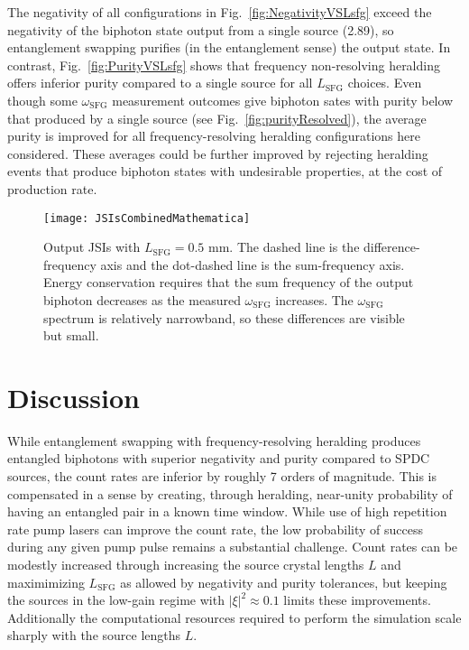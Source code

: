 \documentclass[twocolumn,amssymb, nobibnotes, showpacs, aps, pra,10pt]{revtex4-1}
\newcommand*{\wsfg}{\omega_\textrm{SFG}}
\begin{document}
The negativity of all configurations in Fig.\ \ref{fig:NegativityVSLsfg} exceed the negativity of the biphoton state output from a single source (2.89), so entanglement swapping purifies (in the entanglement sense) the output state. In contrast, Fig.\ \ref{fig:PurityVSLsfg} shows that frequency non-resolving heralding offers inferior purity compared to a single source for all $L_{\text{SFG}}$ choices. Even though some $\wsfg$ measurement outcomes give biphoton sates with purity below that produced by a single source (see Fig.\ \ref{fig:purityResolved}), the average purity is improved for all frequency-resolving heralding configurations here considered. These averages could be further improved by rejecting heralding events that produce biphoton states with undesirable properties, at the cost of production rate.

\begin{figure*}[p]
\begin{center}
\texttt{[image: JSIsCombinedMathematica]}
\caption{Output JSIs with $L_{\text{SFG}} = 0.5$ mm. The dashed line is the difference-frequency axis and the dot-dashed line is the sum-frequency axis. Energy conservation requires that the sum frequency of the output biphoton decreases as the measured $\wsfg$ increases. The $\wsfg$ spectrum is relatively narrowband, so these differences are visible but small.}
\label{fig:outputJSIs}
\end{center}
\end{figure*}

\section{Discussion}
While entanglement swapping with frequency-resolving heralding produces entangled biphotons with superior negativity and purity compared to SPDC sources, the count rates are inferior by roughly 7 orders of magnitude. This is compensated in a sense by creating, through heralding, near-unity probability of having an entangled pair in a known time window. While use of high repetition rate pump lasers can improve the count rate, the low probability of success during any given pump pulse remains a substantial challenge. Count rates can be modestly increased through increasing the source crystal lengths $L$ and maximimizing $L_{\text{SFG}}$ as allowed by negativity and purity tolerances, but keeping the sources in the low-gain regime with $|\xi|^2 \approx 0.1$ limits these improvements. Additionally the computational resources required to perform the simulation scale sharply with the source lengths $L$.
 
\end{document}
